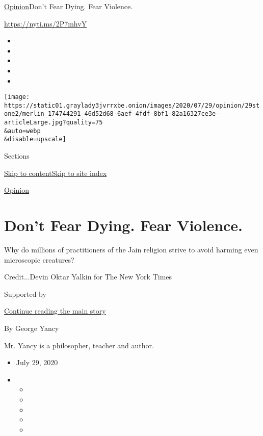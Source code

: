 \href{/section/opinion}{Opinion}\textbar{}Don't Fear Dying. Fear
Violence.

\url{https://nyti.ms/2P7mhvY}

\begin{itemize}
\item
\item
\item
\item
\item
\end{itemize}

\texttt{[image: https://static01.graylady3jvrrxbe.onion/images/2020/07/29/opinion/29stone2/merlin\_174744291\_46d52d68-6aef-4fdf-8bf1-82a16327ce3e-articleLarge.jpg?quality=75\\\&auto=webp\\\&disable=upscale]}

Sections

\protect\hyperlink{site-content}{Skip to
content}\protect\hyperlink{site-index}{Skip to site index}

\href{/section/opinion}{Opinion}

\hypertarget{dont-fear-dying-fear-violence}{%
\section{Don't Fear Dying. Fear
Violence.}\label{dont-fear-dying-fear-violence}}

Why do millions of practitioners of the Jain religion strive to avoid
harming even microscopic creatures?

Credit...Devin Oktar Yalkin for The New York Times

Supported by

\protect\hyperlink{after-sponsor}{Continue reading the main story}

By George Yancy

Mr. Yancy is a philosopher, teacher and author.

\begin{itemize}
\item
  July 29, 2020
\item
  \begin{itemize}
  \item
  \item
  \item
  \item
  \item
  \end{itemize}
\end{itemize}

